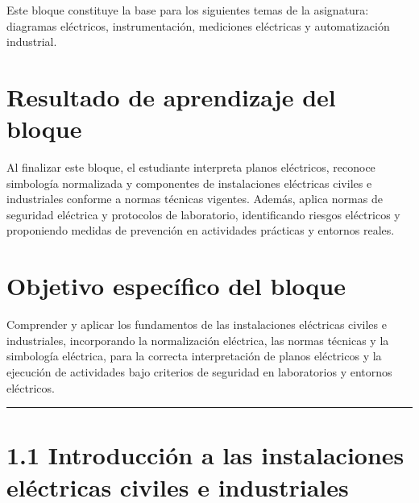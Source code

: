 \documentclass[
  spanish,
  letterpaper,
  DIV=11,
  numbers=noendperiod]{scrreprt}
\begin{document}
\begin{tcolorbox}[enhanced jigsaw, arc=.35mm, bottomrule=.15mm, bottomtitle=1mm, breakable, colback=white, colbacktitle=quarto-callout-note-color!10!white, colframe=quarto-callout-note-color-frame, coltitle=black, left=2mm, leftrule=.75mm, opacityback=0, opacitybacktitle=0.6, rightrule=.15mm, title=\textcolor{quarto-callout-note-color}{\faInfo}\hspace{0.5em}{Nota}, titlerule=0mm, toprule=.15mm, toptitle=1mm]

Este bloque constituye la base para los siguientes temas de la
asignatura: diagramas eléctricos, instrumentación, mediciones eléctricas
y automatización industrial.

\end{tcolorbox}

\section{Resultado de aprendizaje del
bloque}\label{resultado-de-aprendizaje-del-bloque}

Al finalizar este bloque, el estudiante interpreta planos eléctricos,
reconoce simbología normalizada y componentes de instalaciones
eléctricas civiles e industriales conforme a normas técnicas vigentes.
Además, aplica normas de seguridad eléctrica y protocolos de
laboratorio, identificando riesgos eléctricos y proponiendo medidas de
prevención en actividades prácticas y entornos reales.

\section{Objetivo específico del
bloque}\label{objetivo-especuxedfico-del-bloque}

Comprender y aplicar los fundamentos de las instalaciones eléctricas
civiles e industriales, incorporando la normalización eléctrica, las
normas técnicas y la simbología eléctrica, para la correcta
interpretación de planos eléctricos y la ejecución de actividades bajo
criterios de seguridad en laboratorios y entornos eléctricos.

\begin{center}\rule{0.5\linewidth}{0.5pt}\end{center}

\section{1.1 Introducción a las instalaciones eléctricas civiles e
industriales}\label{introducciuxf3n-a-las-instalaciones-eluxe9ctricas-civiles-e-industriales}
\end{document}
